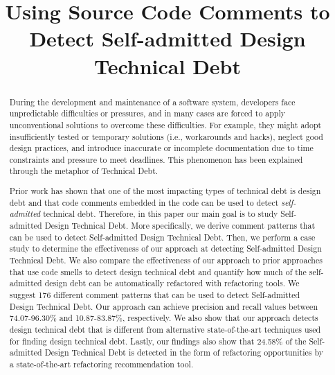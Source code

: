 \documentclass[conference]{IEEEtran}
\newcommand{\SADTD}{Self-admitted Design Technical Debt\xspace}
\begin{document}
\title{Using Source Code Comments to Detect \SADTD}

\author{

}

\maketitle

\begin{abstract}
\par During the development and maintenance of a software system, developers face unpredictable difficulties or pressures, and in many cases are forced to apply unconventional solutions to overcome these difficulties. For example, they might adopt insufficiently tested or temporary solutions (i.e., workarounds and hacks), neglect good design practices, and introduce inaccurate or incomplete documentation
due to time constraints and pressure to meet deadlines. This phenomenon has been explained through the metaphor of Technical Debt.


Prior work has shown that one of the most impacting types of technical debt is design debt and that code comments embedded in the code can be used to detect \emph{self-admitted} technical debt. Therefore, in this paper our main goal is to study \SADTD.
More specifically, we derive comment patterns that can be used to detect \SADTD. Then, we perform a case study to determine the effectiveness of our approach at detecting \SADTD. We also compare the effectiveness of our approach to prior approaches that use code smells to detect design technical debt and quantify how much of the self-admitted design debt can be automatically refactored with refactoring tools. We suggest 176 different comment patterns that can be used to detect \SADTD. Our approach can achieve precision and recall values between 74.07-96.30\% and 10.87-83.87\%, respectively. We also show that our approach detects design technical debt that is different from alternative state-of-the-art techniques used for finding design technical debt. Lastly, our findings also show that 24.58\% of the \SADTD is detected in the form of refactoring opportunities by a state-of-the-art refactoring recommendation tool. 

\end{abstract}
\end{document}
